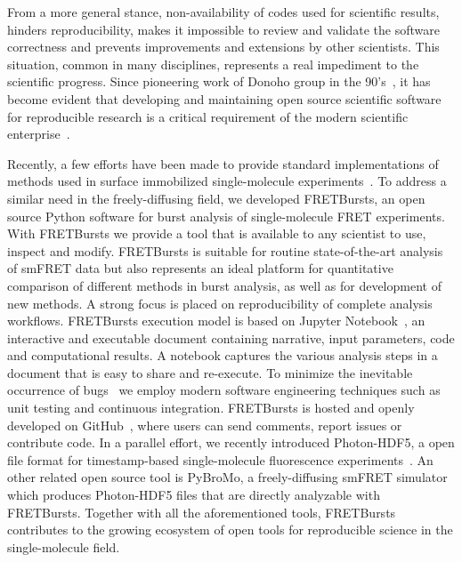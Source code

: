 From a more general stance, non-availability of codes
used for scientific results, hinders reproducibility,
makes it impossible to review and validate the software correctness
and prevents improvements and extensions by other scientists.
This situation, common in many disciplines,
represents a real impediment to the scientific progress.
Since pioneering work of Donoho group in the 90's~\cite{Buckheit_1995},
it has become evident that developing and maintaining open source scientific software
for reproducible research is a critical requirement of the modern
scientific enterprise~\cite{Ince_2012,Vihinen_2015}.


Recently, a few efforts have been made to provide standard implementations of methods used in
surface immobilized single-molecule experiments~\cite{Greenfeld_2012, K_nig_2013}.
To address a similar need in the freely-diffusing field, we developed FRETBursts,
an open source Python software for burst analysis of single-molecule FRET experiments.
With FRETBursts we provide a tool that is available to any scientist
to use, inspect and modify. 
FRETBursts is suitable for routine state-of-the-art
analysis of smFRET data but also represents an ideal platform
for quantitative comparison of different methods in burst analysis, 
as well as for development of new methods.
A strong focus is placed on reproducibility of complete analysis
workflows. FRETBursts execution model is based on Jupyter Notebook~\cite{Shen_2014},
an interactive and executable document containing narrative, input parameters, 
code and computational results. A notebook captures the various analysis steps
in a document that is easy to share and re-execute.
To minimize the inevitable occurrence of bugs~\cite{Soergel_2015} 
we employ modern software engineering techniques
such as unit testing and continuous integration.
FRETBursts is hosted and openly developed on GitHub~\cite{Blischak_2016,Prli__2012},
where users can send comments, report issues or contribute code.
In a parallel effort, we recently introduced Photon-HDF5,
a open file format for timestamp-based single-molecule fluorescence
experiments~\cite{Ingargiola2016}. An other related open source tool is PyBroMo,
a freely-diffusing smFRET simulator which produces Photon-HDF5 files that are
directly analyzable with FRETBursts.
Together with all the aforementioned tools, FRETBursts contributes to the growing 
ecosystem of open tools for reproducible science in the single-molecule field.

